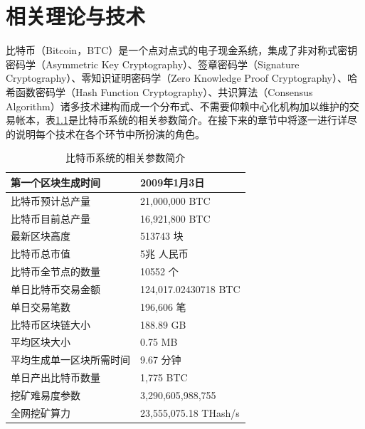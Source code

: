  
\chapter{相关理论与技术}
	
		⽐特币（Bitcoin，BTC）是⼀个点对点式的电⼦现⾦系统，集成了非对称式密钥密码学（Asymmetric Key Cryptography）\supercite{AsymmetricKeyCryptography}、签章密码学（Signature Cryptography）\supercite{Apublickeycryptosystemandasignatureschemebasedondiscretelogarithms}、零知识证明密码学（Zero Knowledge Proof Cryptography）\supercite{Zero-KnowledgeProofsofIdentity}、哈希函数密码学（Hash Function Cryptography）、共识算法（Consensus Algorithm）\supercite{Anonymousbyzantineconsensusfrommoderately-hardpuzzles:Amodelforbitcoin}诸多技术建构而成一个分布式、不需要仰赖中心化机构加以维护的交易帐本，表\ref{IntroductiontoBitcoin}是比特币系统的相关参数简介。在接下来的章节中将逐一进行详尽的说明每个技术在各个环节中所扮演的角色。

		\begin{table}[!htbp]
		\centering
		\caption{比特币系统的相关参数简介}
		\label{IntroductiontoBitcoin}
		\begin{tabular}{|l|l|}
		\hline
		第一个区块生成时间 & 2009年1月3日 \\ \hline
		比特币预计总产量 & 21,000,000 BTC \\ \hline
		比特币目前总产量 & 16,921,800 BTC \\ \hline
		最新区块高度 & 513743 块 \\ \hline
		比特币总市值 & 5兆 人民币 \\ \hline
		比特币全节点的数量 & 10552 个 \\ \hline
		单日比特币交易金额 & 124,017.02430718 BTC \\ \hline
		单日交易笔数 & 196,606 笔 \\ \hline
		比特币区块链大小 & 188.89 GB \\ \hline
		平均区块大小 & 0.75 MB \\ \hline
		平均生成单一区块所需时间 & 9.67 分钟 \\ \hline
		单日产出比特币数量 & 1,775 BTC \\ \hline
		挖矿难易度参数 & 3,290,605,988,755 \\ \hline
		全网挖矿算力 & 23,555,075.18 THash/s \\ \hline
		\end{tabular}
		\end{table}
		

